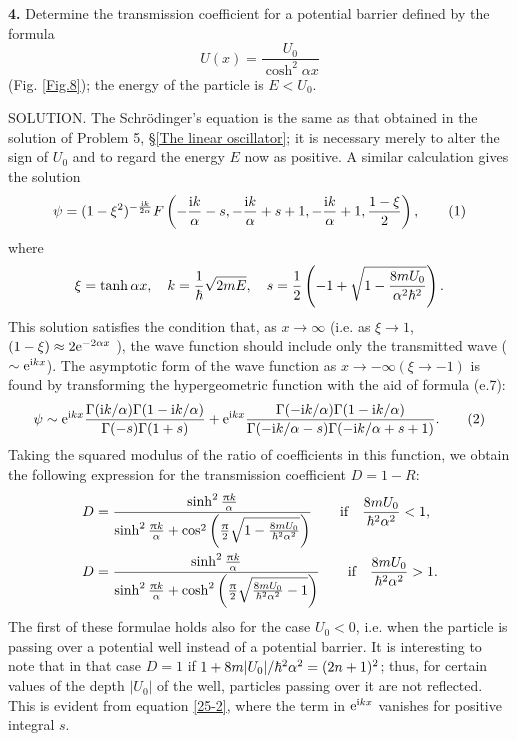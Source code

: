 {\textbf{4.} Determine the transmission coefficient for a potential barrier defined by the formula
\[ U(x)=\frac{U_0}{\cosh^2\alpha x} \]
(Fig. \ref{Fig.8}); the energy of the particle is $ E < U_0 $.






SOLUTION. The Schr\"odinger's equation is the same as that obtained in the solution of Problem 5, \S\ref{The linear oscillator}; it is necessary merely to alter the sign of $ U_0 $ and to regard the energy $ E $ now as positive. A similar calculation gives the solution
\begin{equation}\label{25-1}
\psi=(1-\xi^2)^{-\frac{\mathrm{i} k}{2\alpha}}F\left(-\frac{\mathrm{i} k}{\alpha}-s,-\frac{\mathrm{i} k}{\alpha}+s+1,-\frac{\mathrm{i} k}{\alpha}+1,\frac{1-\xi}{2} \right),\tag{1}
\end{equation}
where
\[ \xi=\tanh\alpha x,\quad k=\frac{1}{\hbar}\sqrt{2mE},\quad s=\frac{1}{2}\left(-1+\sqrt{1-\frac{8mU_0}{\alpha^2\hbar^2}} \right). \]
This solution satisfies the condition that, as $ x \to\infty $ (i.e. as $ \xi\to1$, $(1-\xi)\approx2\mathrm{e}^{-2\alpha x} $ ), the wave function should include only the transmitted wave ($ \sim\mathrm{e}^{\mathrm{i} kx} $). The asymptotic form of the wave function as $ x\to-\infty (\xi\to−1) $ is found by transforming the hypergeometric function with the aid of formula (e.7):
\begin{equation}\label{25-2}
\psi\sim\mathrm{e}^{\mathrm{i} kx}\frac{\Gamma(\mathrm{i} k/\alpha)\Gamma(1-\mathrm{i} k/\alpha)}{\Gamma(-s)\Gamma(1+s)}+\mathrm{e}^{\mathrm{i} kx}\frac{\Gamma(-\mathrm{i} k/\alpha)\Gamma(1-\mathrm{i} k/\alpha)}{\Gamma(-\mathrm{i} k/\alpha-s)\Gamma(-\mathrm{i} k/\alpha+s+1)}.\tag{2}
\end{equation}
Taking the squared modulus of the ratio of coefficients in this function, we obtain the following expression for the transmission coefficient $ D = 1 − R $:
\begin{align*}
D&=\frac{\sinh^2\frac{\uppi k}{\alpha}}{\sinh^2\frac{\uppi k}{\alpha}+\cos^2\left(\frac{\uppi}{2}\sqrt{1-\frac{8mU_0}{\hbar^2\alpha^2}} \right)}\qquad\text{if}\quad\frac{8mU_0}{\hbar^2\alpha^2}<1,\\
D&=\frac{\sinh^2\frac{\uppi k}{\alpha}}{\sinh^2\frac{\uppi k}{\alpha}+\cosh^2\left(\frac{\uppi}{2}\sqrt{\frac{8mU_0}{\hbar^2\alpha^2}-1} \right)}\qquad\text{if}\quad\frac{8mU_0}{\hbar^2\alpha^2}>1.
\end{align*}
The first of these formulae holds also for the case $ U_0 < 0 $, i.e. when the particle is passing over a potential well instead of a potential barrier. It is interesting to note that in that case $ D = 1 $ if $ 1 +8m|U_0|/\hbar^2\alpha^2 = (2n + 1)^2 $; thus, for certain values of the depth $ |U_0| $ of the well, particles passing over it are not reflected. This is evident from equation \eqref{25-2}, where the term in $ \mathrm{e}^{\mathrm{i} kx} $ vanishes for positive integral $ s $.





}
